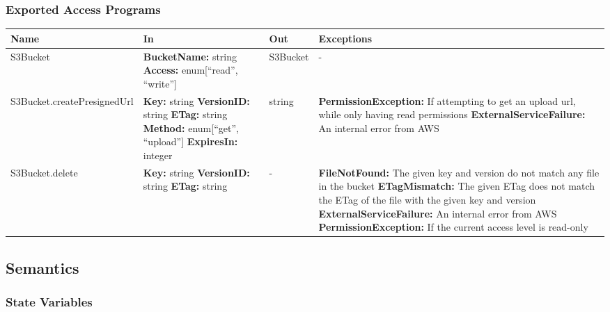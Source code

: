 \documentclass[12pt, titlepage]{article}
\begin{document}
\subsubsection{Exported Access Programs}

\begin{center}
  \begin{tabular}{>{\raggedright}p{5cm} >{\raggedright}p{4cm}
    >{\raggedright}p{2cm} p{4cm}}
    \hline
    \textbf{Name} & \textbf{In} & \textbf{Out} & \textbf{Exceptions} \\
    \hline
    S3Bucket & \textbf{BucketName:} string \newline \textbf{Access:}
    enum[``read'', ``write''] & S3Bucket & - \\
    \hline
    S3Bucket.createPresignedUrl & \textbf{Key:} string \newline
    \textbf{VersionID:} string \newline \textbf{ETag:} string
    \newline \textbf{Method:} enum[``get'', ``upload''] \newline
    \textbf{ExpiresIn:} integer & string &
    \textbf{PermissionException:} If attempting to get an upload url,
    while only having read permissions \newline
    \textbf{ExternalServiceFailure:} An internal error from AWS \\
    \hline
    S3Bucket.delete & \textbf{Key:} string \newline
    \textbf{VersionID:} string \newline \textbf{ETag:} string & - &
    \textbf{FileNotFound:} The given key and version do not match any
    file in the bucket \newline \textbf{ETagMismatch:} The given ETag
    does not match the ETag of the file with the given key and
    version \newline \textbf{ExternalServiceFailure:} An internal
    error from AWS \newline \textbf{PermissionException:} If the
    current access level is read-only \\
    \hline
  \end{tabular}
\end{center}

\subsection{Semantics}

\subsubsection{State Variables}
\end{document}

